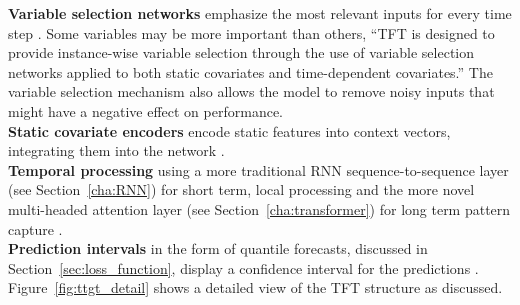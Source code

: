     \clearpage
    \noindent\textbf{Variable selection networks} emphasize the most relevant inputs for every time step \cite{lim_temporal_2020}. Some variables may be more important than others, \enquote{TFT is designed to provide instance-wise variable selection through the use of variable selection networks applied to both static covariates and time-dependent covariates.} \cite{lim_temporal_2020} The variable selection mechanism also allows the model to remove noisy inputs that might have a negative effect on performance. \\
    \textbf{Static covariate encoders} encode static features into context vectors, integrating them into the network \cite{lim_temporal_2020}.  \\
    \textbf{Temporal processing} using a more traditional RNN sequence-to-sequence layer (see Section~\ref{cha:RNN}) for short term, local processing and the more novel multi-headed attention layer (see Section~\ref{cha:transformer}) for long term pattern capture \cite{lim_temporal_2020}.\\
    \textbf{Prediction intervals} in the form of quantile forecasts, discussed in Section~\ref{sec:loss_function}, display a confidence interval for the predictions \cite{lim_temporal_2020}. \\
    Figure~\ref{fig:ttgt_detail} shows a detailed view of the TFT structure as discussed. 
    

